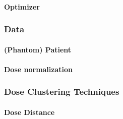 \paragraph{Optimizer}

\subsubsection{Data}
\paragraph{(Phantom) Patient}

\paragraph{Dose normalization}

\subsubsection{Dose Clustering Techniques}
\paragraph{Dose Distance}

